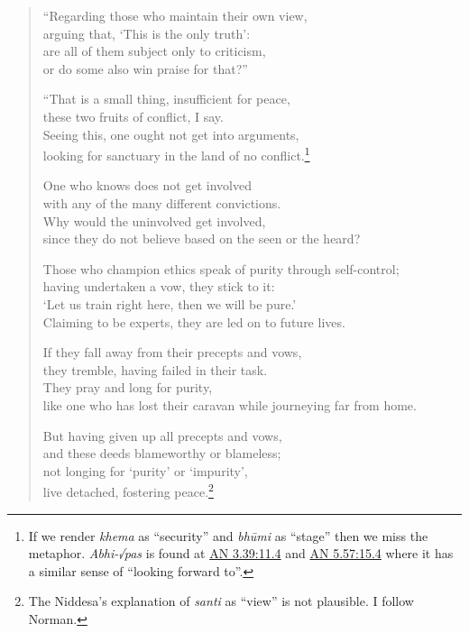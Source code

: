 \documentclass[12pt,openany]{book}%
\begin{document}
\begin{verse}%
“Regarding those who maintain their own view, \\
arguing that, ‘This is the only truth’: \\
are all of them subject only to criticism, \\
or do some also win praise for that?” 

“That is a small thing, insufficient for peace, \\
these two fruits of conflict, I say. \\
Seeing this, one ought not get into arguments, \\
looking for sanctuary in the land of no conflict.\footnote{If we render \textit{khema} as “security” and \textit{\textsanskrit{bhūmi}} as “stage” then we miss the metaphor. \textit{Abhi-√pas} is found at \href{https://suttacentral.net/an3.39/en/sujato\#11.4}{AN 3.39:11.4} and \href{https://suttacentral.net/an5.57/en/sujato\#15.4}{AN 5.57:15.4} where it has a similar sense of “looking forward to”. } 

One who knows does not get involved \\
with any of the many different convictions. \\
Why would the uninvolved get involved, \\
since they do not believe based on the seen or the heard? 

Those who champion ethics speak of purity through self-control; \\
having undertaken a vow, they stick to it: \\
‘Let us train right here, then we will be pure.’ \\
Claiming to be experts, they are led on to future lives. 

If they fall away from their precepts and vows, \\
they tremble, having failed in their task. \\
They pray and long for purity, \\
like one who has lost their caravan while journeying far from home. 

But having given up all precepts and vows, \\
and these deeds blameworthy or blameless; \\
not longing for ‘purity’ or ‘impurity’, \\
live detached, fostering peace.\footnote{The Niddesa’s explanation of \textit{santi} as “view” is not plausible. I follow Norman. } 


\end{verse}
\end{document}
